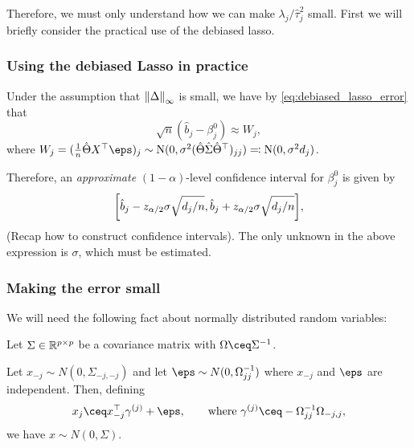 Therefore, we must only understand how we can make $\lambda_j/\hat\tau_j^2$ small. First we will briefly consider the practical use of the debiased lasso. 

\subsubsection{Using the debiased Lasso in practice}
Under the assumption that $\norm{\Delta}_\infty$ is small, we have by \cref{eq:debiased_lasso_error} that
\[
\sqrt n(\hat b_j  - \beta^0_j) \approx  W_j, 
\]
where $W_j = (\frac1n \hat\Theta X\T\eps)_j \sim \Rm N(0, \sigma^2 (\hat\Theta\hat\Sigma\hat\Theta\T)_{jj}) \eqqcolon \Rm N(0, \sigma^2 d_j)$.

Therefore, an \emph{approximate} $(1 - \alpha)$-level confidence interval for $\beta^0_j$ is given by 
\[
\qty[\hat b_j - z_{\alpha/2} \sigma \sqrt{d_j/n} , \hat b_j + z_{\alpha / 2} \sigma \sqrt{{d_j}/{n}}],
\]  
(\TODO Recap how to construct confidence intervals).  The only unknown in the above expression is $\sigma$, which must be estimated. 

\subsubsection{Making the error small}
We will need the following fact about normally distributed random variables:
\begin{lemma} \label{lem:multivariate_normal_conditional}
	Let $\Sigma \in \mathbb R^{p \times p}$ be a covariance matrix with $\Omega \ceq \Sigma^{-1}$.
	
	Let $x_{-j} \sim N(0, \Sigma_{-j, -j})$ and let $\eps \sim N(0, \Omega_{jj}^{-1})$ where $x_{-j}$ and $\eps$ are independent. Then, defining
	\[
	x_j \ceq x_{-j}\T \gamma^{(j)} + \eps, \qquad\text{where } \gamma^{(j)} \ceq - \Omega_{jj}^{-1} \Omega_{-j, j},
	\]
	we have $x \sim N(0, \Sigma)$. 
\end{lemma}


